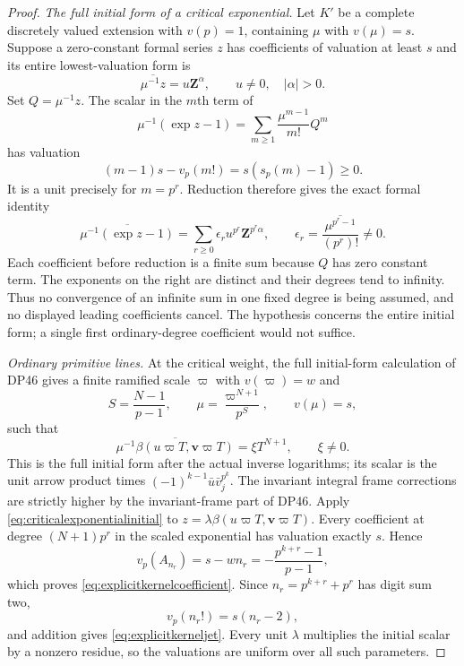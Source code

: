 \documentclass[11pt,a4paper]{article}
\theoremstyle{definition}\newtheorem{remark}[theorem]{Remark}
\begin{document}
\begin{proof}
\emph{The full initial form of a critical exponential.}
Let $K'$ be a complete discretely valued extension with $v(p)=1$, containing $\mu$ with $v(\mu)=s$.
Suppose a zero-constant formal series $z$ has coefficients of valuation at least $s$ and its entire lowest-valuation form is
\[
 \overline{\mu^{-1}z}=u\mathbf Z^\alpha,
 \qquad u\ne0,\quad |\alpha|>0.
\]
Set $Q=\mu^{-1}z$.
The scalar in the $m$th term of
\[
 \mu^{-1}(\exp z-1)
 =\sum_{m\ge1}\frac{\mu^{m-1}}{m!}Q^m
\]
has valuation
\[
 (m-1)s-v_p(m!)=s(s_p(m)-1)\ge0.
\]
It is a unit precisely for $m=p^r$.
Reduction therefore gives the exact formal identity
\begin{equation}\label{eq:criticalexponentialinitial}
 \overline{\mu^{-1}(\exp z-1)}
 =\sum_{r\ge0}\epsilon_r u^{p^r}\mathbf Z^{p^r\alpha},
 \qquad
 \epsilon_r=\overline{\frac{\mu^{p^r-1}}{(p^r)!}}\ne0.
\end{equation}
Each coefficient before reduction is a finite sum because $Q$ has zero constant term.
The exponents on the right are distinct and their degrees tend to infinity.
Thus no convergence of an infinite sum in one fixed degree is being assumed, and no displayed leading coefficients cancel.
The hypothesis concerns the entire initial form; a single first ordinary-degree coefficient would not suffice.

\emph{Ordinary primitive lines.}
At the critical weight, the full initial-form calculation of DP46 gives a finite ramified scale $\varpi$ with $v(\varpi)=w$ and
\[
 S=\frac{N-1}{p-1},\qquad
 \mu=\frac{\varpi^{N+1}}{p^S},\qquad v(\mu)=s,
\]
such that
\[
 \overline{\mu^{-1}\beta(u\varpi T,\mathbf v\varpi T)}
 =\xi T^{N+1},\qquad \xi\ne0.
\]
This is the full initial form after the actual inverse logarithms; its scalar is the unit arrow product times
$(-1)^{k-1}\bar u\bar v_j^{p^k}$.
The invariant integral frame corrections are strictly higher by the invariant-frame part of DP46.
Apply \eqref{eq:criticalexponentialinitial} to $z=\lambda\beta(u\varpi T,\mathbf v\varpi T)$.
Every coefficient at degree $(N+1)p^r$ in the scaled exponential has valuation exactly $s$.
Hence
\[
 v_p(A_{n_r})=s-wn_r
 =-\frac{p^{k+r}-1}{p-1},
\]
which proves \eqref{eq:explicitkernelcoefficient}.
Since $n_r=p^{k+r}+p^r$ has digit sum two,
\[
 v_p(n_r!)=s(n_r-2),
\]
and addition gives \eqref{eq:explicitkerneljet}.
Every unit $\lambda$ multiplies the initial scalar by a nonzero residue, so the valuations are uniform over all such parameters.


\end{proof}
\end{document}
